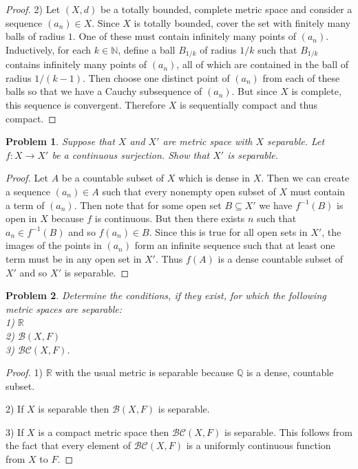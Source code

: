 \documentclass{article}
\newtheorem{problem}{Problem}
\begin{document}
\begin{flushleft}
\begin{proof}
2) Let $(X,d)$ be a totally bounded, complete metric space and consider a sequence $(a_n) \in X$. Since $X$ is totally bounded, cover the set with finitely many balls of radius $1$. One of these must contain infinitely many points of $(a_n)$. Inductively, for each $k \in \mathbb{N}$, define a ball $B_{1/k}$ of radius $1/k$ such that $B_{1/k}$ contains infinitely many points of $(a_n)$, all of which are contained in the ball of radius $1/(k-1)$. Then choose one distinct point of $(a_n)$ from each of these balls so that we have a Cauchy subsequence of $(a_n)$. But since $X$ is complete, this sequence is convergent. Therefore $X$ is sequentially compact and thus compact.
\end{proof}

\begin{problem}
Suppose that $X$ and $X'$ are metric space with $X$ separable. Let $f : X \rightarrow X'$ be a continuous surjection. Show that $X'$ is separable.
\end{problem}
\begin{proof}
Let $A$ be a countable subset of $X$ which is dense in $X$. Then we can create a sequence $(a_n) \in A$ such that every nonempty open subset of $X$ must contain a term of $(a_n)$. Then note that for some open set $B \subseteq X'$ we have $f^{-1}(B)$ is open in $X$ because $f$ is continuous. But then there exists $n$ such that $a_n \in f^{-1}(B)$ and so $f(a_n) \in B$. Since this is true for all open sets in $X'$, the images of the points in $(a_n)$ form an infinite sequence such that at least one term must be in any open set in $X'$. Thus $f(A)$ is a dense countable subset of $X'$ and so $X'$ is separable.
\end{proof}

\begin{problem}
Determine the conditions, if they exist, for which the following metric spaces are separable:\\
1) $\mathbb{R}$\\
2) $\mathcal{B} (X, F)$\\
3) $\mathcal{BC} (X, F)$.
\end{problem}
\begin{proof}
1) $\mathbb{R}$ with the usual metric is separable because $\mathbb{Q}$ is a dense, countable subset.\newline

2) If $X$ is separable then $\mathcal{B} (X, F)$ is separable.\newline

3) If $X$ is a compact metric space then $\mathcal{BC} (X, F)$ is separable. This follows from the fact that every element of $\mathcal{BC} (X, F)$ is a uniformly continuous function from $X$ to $F$.
\end{proof}


\end{flushleft}
\end{document}

